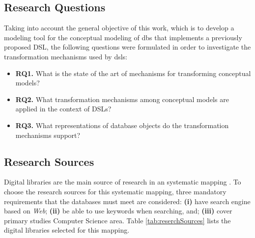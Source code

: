 \subsection{Research Questions} \label{ssec_slm:researchQuestions}

Taking into account the general objective of this work, which is to develop a modeling tool for the conceptual modeling of \acp{db} that implements a previously proposed DSL, the following questions were formulated in order to investigate the transformation mechanisms used by \acp{dsl}:

\begin{itemize}
    \item \textbf{RQ1.} What is the state of the art of mechanisms for transforming conceptual models?
    \item \textbf{RQ2.} What transformation mechanisms among conceptual models are applied in the context of DSLs?
    \item \textbf{RQ3.} What representations of database objects do the transformation mechanisms support?
\end{itemize}

\subsection{Research Sources} \label{ssec_slm:researchSources}

Digital libraries are the main source of research in an systematic mapping \cite{Petersen:2008}.
To choose the research sources for this systematic mapping, three mandatory requirements that the databases must meet are considered:
\textbf{(i)} have search engine based on \textit{Web};
\textbf{(ii)} be able to use keywords when searching, and;
\textbf{(iii)} cover primary studies Computer Science area.
Table \ref{tab:reserchSources} lists the digital libraries selected for this mapping.
        

